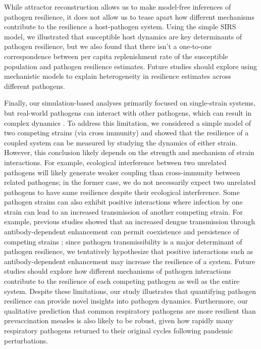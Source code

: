 \documentclass[12pt]{article}
\begin{document}
While attractor reconstruction allows us to make model-free inferences of pathogen resilience, it does not allow us to tease apart how different mechanisms contribute to the resilience a host-pathogen system.
Using the simple SIRS model, we illustrated that susceptible host dynamics are key determinants of pathogen resilience, but we also found that there isn't a one-to-one correspondence between per capita replenishment rate of the susceptible population and pathogen resilience estimates.
Future studies should explore using mechanistic models to explain heterogeneity in resilience estimates across different pathogens.

Finally, our simulation-based analyses primarily focused on single-strain systems, but real-world pathogens can interact with other pathogens, which can result in complex dynamics \citep{rohani2003ecological,nickbakhsh2019virus}.
To address this limitation, we considered a simple model of two competing strains (via cross immunity) and showed that the resilience of a coupled system can be measured by studying the dynamics of either strain. 
However, this conclusion likely depends on the strength and mechanism of strain interactions.
For example, ecological interference between two unrelated pathogens \citep{rohani2003ecological} will likely generate weaker coupling than cross-immunity between related pathogens;
in the former case, we do not necessarily expect two unrelated pathogens to have same resilience despite their ecological interference.
Some pathogen strains can also exhibit positive interactions where infection by one strain can lead to an increased transmission of another competing strain.
For example, previous studies showed that an increased dengue transmission through antibody-dependent enhancement can permit coexistence and persistence of competing strains \citep{ferguson1999effect};
since pathogen transmissibility is a major determinant of pathogen resilience, we tentatively hypothesize that positive interactions such as antibody-dependent enhancement may increase the resilience of a system.
Future studies should explore how different mechanisms of pathogen interactions contribute to the resilience of each competing pathogen as well as the entire system.
Despite these limitations, our study illustrates that quantifying pathogen resilience can provide novel insights into pathogen dynamics.
Furthermore, our qualitative prediction that common respiratory pathogens are more resilient than prevaccination measles is also likely to be robust, given how rapidly many respiratory pathogens returned to their original cycles following pandemic perturbations.
\end{document}
